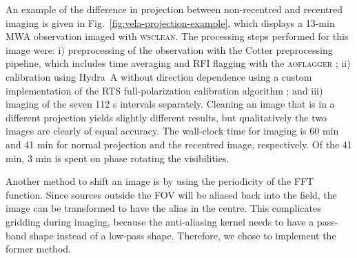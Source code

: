 \documentclass[useAMS,usenatbib]{mn2e}
\begin{document}
An example of the difference in projection between non-recentred and recentred imaging is given in Fig.~\ref{fig:vela-projection-example}, which displays a 13-min MWA observation imaged with \textsc{wsclean}. The processing steps performed for this image were: i) preprocessing of the observation with the Cotter preprocessing pipeline, which includes time averaging and RFI flagging with the \textsc{aoflagger} \citep{post-correlation-rfi-classification,scale-invariant-rank-operator}; ii) calibration using Hydra~A without direction dependence using a custom implementation of the RTS full-polarization calibration algorithm \citep{rts-mwa}; and iii) imaging of the seven 112 s intervals separately. Cleaning an image that is in a different projection yields slightly different results, but qualitatively the two images are clearly of equal accuracy. The wall-clock time for imaging is 60 min and 41 min for normal projection and the recentred image, respectively. Of the 41 min, 3 min is spent on phase rotating the visibilities.

Another method to shift an image is by using the periodicity of the FFT function. Since sources outside the FOV will be aliased back into the field, the image can be transformed to have the alias in the centre. This complicates gridding during imaging, because the anti-aliasing kernel needs to have a pass-band shape instead of a low-pass shape. Therefore, we chose to implement the former method.
\end{document}
